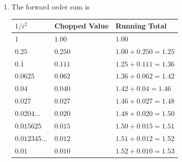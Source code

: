 \begin{myexercise}
\begin{mysolution}
\begin{enumerate}[label=(\alph*)]
\item The forward order sum is
\begin{center}
\begin{tabular}{|l|l|l|}\hline
$1/i^2$&Chopped Value&Running Total\\\hline
$1$&$1.00$&$1.00$\\
$0.25$&$0.250$&$1.00+0.250=1.25$\\
$0.\bar{1}$&$0.111$&$1.25+0.111=1.36$\\
$0.0625$&$0.062$&$1.36+0.062=1.42$\\
$0.04$&$0.040$&$1.42+0.04=1.46$\\
$0.02\bar{7}$&$0.027$&$1.46+0.027=1.48$\\
$0.0204\ldots$&$0.020$&$1.48+0.020=1.50$\\
$0.015625$&$0.015$&$1.50+0.015=1.51$\\
$0.012345\ldots$&$0.012$&$1.51+0.012=1.52$\\
$0.01$&$0.010$&$1.52+0.010=1.53$\\\hline
\end{tabular}
\end{center}
%
%

\end{enumerate}
\end{mysolution}


\end{myexercise}

